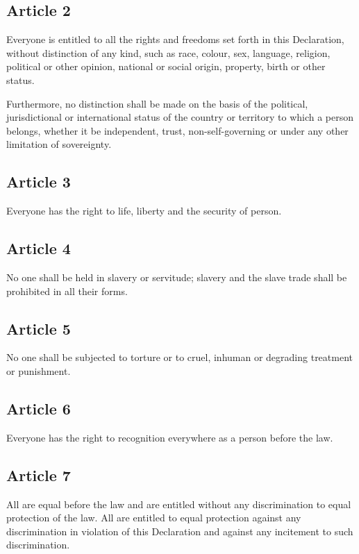 \documentclass[
  ngerman,
  american,
  titlepage,
  openright,
  DIV=calc,
  toc=listof,
  listof=nochaptergap]{scrbook}
\begin{document}
\subsection{Article 2}\label{article-2-1}

Everyone is entitled to all the rights and freedoms set forth in this
Declaration, without distinction of any kind, such as race, colour, sex,
language, religion, political or other opinion, national or social
origin, property, birth or other status.

Furthermore, no distinction shall be made on the basis of the political,
jurisdictional or international status of the country or territory to
which a person belongs, whether it be independent, trust,
non-self-governing or under any other limitation of sovereignty.

\subsection{Article 3}\label{article-3-1}

Everyone has the right to life, liberty and the security of person.

\subsection{Article 4}\label{article-4-1}

No one shall be held in slavery or servitude; slavery and the slave
trade shall be prohibited in all their forms.

\subsection{Article 5}\label{article-5-1}

No one shall be subjected to torture or to cruel, inhuman or degrading
treatment or punishment.

\subsection{Article 6}\label{article-6-1}

Everyone has the right to recognition everywhere as a person before the
law.

\subsection{Article 7}\label{article-7-1}

All are equal before the law and are entitled without any discrimination
to equal protection of the law. All are entitled to equal protection
against any discrimination in violation of this Declaration and against
any incitement to such discrimination.
\end{document}
